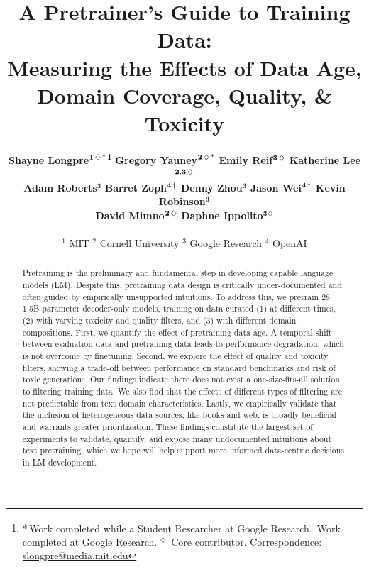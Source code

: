 \documentclass{article}
\title{
\vspace{-10mm}
\textbf{
A Pretrainer's Guide to Training Data: \\Measuring the Effects of Data Age, Domain Coverage, Quality, \& Toxicity
}
\vspace{-3mm}
  }
\author{
\normalsize{}
\textbf{Shayne Longpre\tinyspace$^{\mathbf{1}\hspace{0.12em}\diamondsuit\text{\hspace{0.12em}*}}$\thanks{*\,Work completed while a Student Researcher at Google Research. \newline \hspace*{1.5em} \textsuperscript{\textdagger}\,Work completed at Google Research.\newline \hspace*{1.5em} $^\diamondsuit$ \,Core contributor. Correspondence: \url{slongpre@media.mit.edu}}}\hspace{5mm}
\textbf{Gregory Yauney\tinyspace$^{\mathbf{2}\hspace{0.12em}\diamondsuit\text{\hspace{0.12em}*}}$} \hspace{5mm} 
\textbf{Emily Reif\tinyspace$^{\mathbf{3}\hspace{0.12em}\diamondsuit}$} \hspace{5mm}
\textbf{Katherine Lee\tinyspace$^{\mathbf{2,3}\hspace{0.12em}\diamondsuit}$} \hspace{5mm}
\\
\normalsize{}
\textbf{Adam Roberts\tinyspace$^{\mathbf{3}}$} \hspace{5mm} 
\textbf{Barret Zoph\tinyspace$^{\mathbf{4}\hspace{0.12em}\text{\textdagger}}$} \hspace{5mm}
\textbf{Denny Zhou\tinyspace$^{\mathbf{3}}$} \hspace{5mm} 
\textbf{Jason Wei\tinyspace$^{\mathbf{4}\hspace{0.12em}\text{\textdagger}}$} \hspace{5mm}
\textbf{Kevin Robinson\tinyspace$^{\mathbf{3}}$} \hspace{5mm}
\\
\normalsize{}
\textbf{David Mimno\tinyspace$^{\mathbf{2}\hspace{0.12em}\diamondsuit}$} \hspace{5mm} 
\textbf{Daphne Ippolito\tinyspace$^{\mathbf{3}}$\tinyspace$^{\diamondsuit}$} \hspace{4mm}
\\
\\
\normalsize{}
$^{1}$ MIT
\hspace{5mm}
$^{2}$ Cornell University
\hspace{5mm}
$^{3}$ Google Research
\hspace{5mm}
$^{4}$ OpenAI
\vspace{-4mm}
}
\date{}
\begin{document}

\maketitle

\begin{abstract}
\noindent 
Pretraining is the preliminary and fundamental step in developing capable language models (LM).
Despite this, pretraining data design is critically under-documented and often guided by empirically unsupported intuitions.
To address this, we pretrain 28 1.5B parameter decoder-only models, training on data curated (1) at different times, (2) with varying toxicity and quality filters, and (3) with different domain compositions.
First, we quantify the effect of pretraining data age.
A temporal shift between evaluation data and pretraining data leads to performance degradation, which is not overcome by finetuning.
Second, we explore the effect of quality and toxicity filters, showing a trade-off between performance on standard benchmarks and risk of toxic generations.
Our findings indicate there does not exist a one-size-fits-all solution to filtering training data.
We also find that the effects of different types of filtering are not predictable from text domain characteristics.
Lastly, we empirically validate that the inclusion of heterogeneous data sources, like books and web, is broadly beneficial and warrants greater prioritization.
These findings constitute the largest set of experiments to validate, quantify, and expose many undocumented intuitions about text pretraining, which we hope will help support more informed data-centric decisions in LM development.
\end{abstract}
\end{document}
